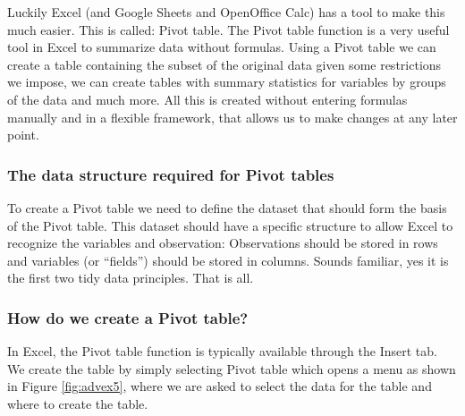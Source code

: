 \documentclass[]{book}
\begin{document}
Luckily Excel (and Google Sheets and OpenOffice Calc) has a tool to make this much easier. This is called: Pivot table. The Pivot table function is a very useful tool in Excel to summarize data without formulas. Using a Pivot table we can create a table containing the subset of the original data given some restrictions we impose, we can create tables with summary statistics for variables by groups of the data and much more. All this is created without entering formulas manually and in a flexible framework, that allows us to make changes at any later point.

\hypertarget{the-data-structure-required-for-pivot-tables}{%
\subsubsection*{The data structure required for Pivot tables}\label{the-data-structure-required-for-pivot-tables}}

To create a Pivot table we need to define the dataset that should form the basis of the Pivot table. This dataset should have a specific structure to allow Excel to recognize the variables and observation: Observations should be stored in rows and variables (or ``fields'') should be stored in columns. Sounds familiar, yes it is the first two tidy data principles. That is all.

\hypertarget{how-do-we-create-a-pivot-table}{%
\subsubsection*{How do we create a Pivot table?}\label{how-do-we-create-a-pivot-table}}

In Excel, the Pivot table function is typically available through the Insert tab. We create the table by simply selecting Pivot table which opens a menu as shown in Figure \ref{fig:advex5}, where we are asked to select the data for the table and where to create the table.
\end{document}
